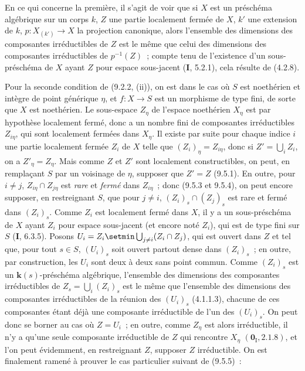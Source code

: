 En ce qui concerne la première, il s'agit de voir que si $X$ est un préschéma
algébrique sur un corps $k$, $Z$ une partie localement fermée de $X$, $k'$ une
extension de $k$, $p:X_{(k')}\to X$ la projection canonique, alors l'ensemble
des dimensions des composantes irréductibles de $Z$ est le même que celui des
dimensions des composantes irréductibles de $p^{-1}(Z)$~; compte tenu de
l'existence d'un sous-préschéma de $X$ ayant $Z$ pour espace sous-jacent
(\textbf{I}, 5.2.1), cela résulte de (4.2.8).

Pour la seconde condition de (9.2.2, (ii)), on est dans le cas où $S$ est
noethérien et intègre de point générique $\eta$, et $f:X\to S$ est un
morphisme de type fini, de sorte que $X$ est noethérien. Le sous-espace
$Z_\eta$ de l'espace noethérien $X_\eta$ est par hypothèse localement fermé,
donc a un nombre fini de composantes irréductibles $Z_{i\eta}$, qui sont
localement fermées dans $X_\eta$. Il existe par suite pour chaque indice $i$
une partie localement fermée $Z_i$ de $X$ telle que $(Z_i)_\eta=Z_{i\eta}$,
donc si $Z'=\bigcup_i Z_i$, on a $Z'_\eta=Z_\eta$. Mais comme $Z$ et $Z'$ sont
localement constructibles, on peut, en remplaçant $S$ par un voisinage de
$\eta$, supposer que $Z'=Z$ (9.5.1). En outre, pour $i\neq j$,
$Z_{i\eta}\cap Z_{j\eta}$ est \emph{rare} et \emph{fermé} dans $Z_{i\eta}$~; donc
(9.5.3 et 9.5.4), on peut encore supposer, en restreignant $S$, que pour
$j\neq i$, $(Z_i)_s\cap(Z_j)_s$ est rare et fermé dans $(Z_i)_s$. Comme $Z_i$
est localement fermé dans $X$, il y a un sous-préschéma de $X$ ayant $Z_i$
pour espace sous-jacent (et encore noté $Z_i$), qui est de type fini sur
$S$ (\textbf{I}, 6.3.5). Posons
$U_i=Z_i\setmin\bigcup_{j\neq i}(Z_i\cap Z_j)$, qui est ouvert dans $Z$ et tel que,
pour tout $s\in S$, $(U_i)_s$ soit ouvert partout dense dans $(Z_i)_s$~; en
outre, par construction, les $U_i$ sont deux à deux sans point commun. Comme
$(Z_i)_s$ est un $\boldsymbol{k}(s)$-préschéma algébrique, l'ensemble des dimensions des
composantes irréductibles de $Z_s=\bigcup_i(Z_i)_s$ est le même que l'ensemble
des dimensions des composantes irréductibles de la réunion des $(U_i)_s$
(4.1.1.3), chacune de ces composantes étant déjà une composante irréductible
de l'un des $(U_i)_s$. On peut donc se borner au cas où $Z=U_i$~; en outre,
comme $Z_\eta$ est alors irréductible, il n'y a qu'une seule composante
irréductible de $Z$ qui rencontre $X_\eta$ $(\mathbf 0_{\mathrm I},2.1.8)$, et
l'on peut évidemment, en restreignant $Z$, supposer $Z$ irréductible. On est
finalement ramené à prouver le cas particulier suivant de (9.5.5)~:

